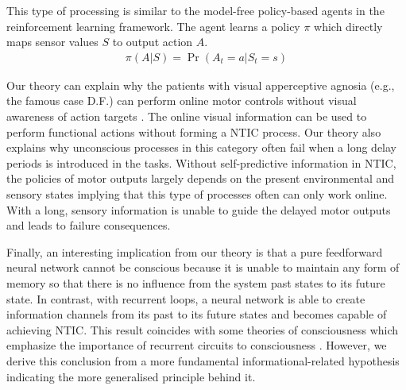 \documentclass[utf8]{article}
\begin{document}
             This type of processing is similar to the model-free policy-based agents in the reinforcement learning framework. The agent learns a policy $\pi$ which directly maps sensor values $S$ to output action $A$.
    		\begin{equation}
    			\label{eq:PolicyBasedAgent}
    			\begin{aligned}
    			    \pi(A | S)=\operatorname{Pr}\left(A_{t}=a | S_{t}=s\right)
    			\end{aligned}
    		\end{equation}
    		
    		Our theory can explain why the patients with visual apperceptive agnosia (e.g., the famous case D.F.\cite{james2003ventral}) can perform online motor controls without visual awareness of action targets \citep{10.3389/fneur.2014.00255}. The online visual information can be used to perform functional actions without forming a NTIC process. Our theory also explains why unconscious processes in this category often fail when a long delay periods is introduced in the tasks. Without self-predictive information in NTIC, the policies of motor outputs largely depends on the present environmental and sensory states implying that this type of processes often can only work online. With a long, sensory information is unable to guide the delayed motor outputs and leads to failure consequences. 
    		
    		Finally, an interesting implication from our theory is that a pure feedforward neural network cannot be conscious because it is unable to maintain any form of memory so that there is no influence from the system past states to its future state. In contrast, with recurrent loops, a neural network is able to create information channels from its past to its future states and becomes capable of achieving NTIC. This result coincides with some theories of consciousness which emphasize the importance of recurrent circuits to consciousness \citep{lamme2006towards, edelman1992bright, tononi2008neural}.
    		However, we derive this conclusion from a more fundamental informational-related hypothesis indicating the more generalised principle behind it. 

\end{document}
